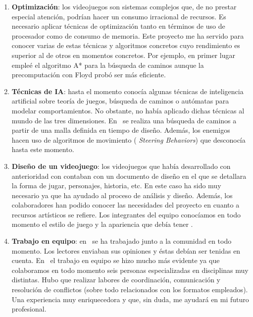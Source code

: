 \begin{enumerate}
    \item \textbf{Optimización}: los videojuegos son sistemas complejos
    que, de no prestar especial atención, podrían hacer un consumo irracional
    de recursos. Es necesario aplicar técnicas de optimización tanto en
    términos de uso de procesador como de consumo de memoria. Este proyecto
    me ha servido para conocer varias de estas técnicas y algoritmos concretos
    cuyo rendimiento es superior al de otros en momentos concretos. Por ejemplo,
    en primer lugar empleé el algoritmo A* para la búsqueda de caminos
    aunque la precomputación con Floyd probó ser más eficiente.\\
    
    \item \textbf{Técnicas de IA}: hasta el momento conocía algunas técnicas
    de inteligencia artificial sobre teoría de juegos, búsqueda de caminos
    o autómatas para modelar comportamientos. No obstante, no había aplicado
    dichas técnicas al mundo de las tres dimensiones. En \juego\ se realiza
    una búsqueda de caminos a partir de una malla definida en tiempo de diseño.
    Además, los enemigos hacen uso de algoritmos de movimiento (
    \textit{Steering Behaviors}) que desconocía hasta este momento.\\
     
    \item \textbf{Diseño de un videojuego}: los videojuegos que había
    desarrollado con anterioridad con contaban con un documento de diseño
    en el que se detallara la forma de jugar, personajes, historia, etc.
    En este caso ha sido muy necesario ya que ha ayudado al proceso de análisis
    y diseño. Además, los colaboradores han podido conocer las necesidades
    del proyecto en cuanto a recursos artísticos se refiere. Los integrantes
    del equipo conocíamos en todo momento el estilo de juego y la apariencia
    que debía tener \juego.\\
    
    \item \textbf{Trabajo en equipo}: en \wiki\ se ha trabajado junto
    a la comunidad en todo momento. Los lectores enviaban sus opiniones y
    éstas debían ser tenidas en cuenta. En \juego\ el trabajo en equipo
    se hizo mucho más evidente ya que colaboramos en todo momento seis
    personas especializadas en disciplinas muy distintas. Hubo que realizar
    labores de coordinación, comunicación y resolución de conflictos
    (sobre todo relacionados con los formatos empleados). Una experiencia
    muy enriquecedora y que, sin duda, me ayudará en mi futuro profesional.\\ 
    

\end{enumerate}
